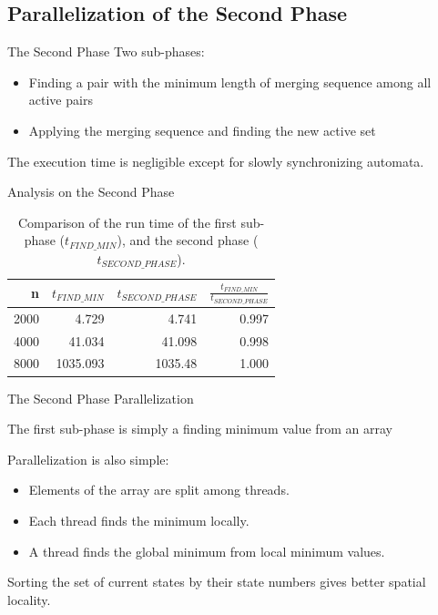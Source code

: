 \documentclass{beamer}
\begin{document}
\subsection{Parallelization of the Second Phase}
\begin{frame}{The Second Phase}
	Two sub-phases:
	\begin{itemize}
		\item Finding a pair with the minimum length of merging sequence among all active pairs
		\item Applying the merging sequence and finding the new active set
	\end{itemize}
	
	The execution time is negligible except for slowly synchronizing automata.
\end{frame}

\begin{frame}{Analysis on the Second Phase}
\begin{table}[ht]
	\begin{tabular}{r|rrr}
			
		n & $t_{FIND\_MIN}$ & $t_{SECOND\_PHASE}$ & $\frac{t_{FIND\_MIN}}{t_{SECOND\_PHASE}}$ \\\hline
		2000 & 4.729 & 4.741 & 0.997 \\
		4000 & 41.034 & 41.098 & 0.998 \\
		8000 & 1035.093 & 1035.48 & 1.000 \\
	\end{tabular}
	
	\caption{Comparison of the run time of the first sub-phase ($t_{FIND\_MIN}$), and the second phase ($t_{SECOND\_PHASE}$).}
	\label{table:phase-2-comparison}
\end{table}
\end{frame}

\begin{frame}{The Second Phase Parallelization}

	The first sub-phase is simply a finding minimum value from an array
	
	\medskip
	
	Parallelization is also simple:
	\begin{itemize}
		\item Elements of the array are  split among threads.
		\item Each thread finds the minimum locally.
		\item A thread finds the global minimum from local minimum values. 
	\end{itemize}
	
	\medskip
	
	Sorting the set of current states by their state numbers gives better spatial locality. 
\end{frame}
\end{document}
